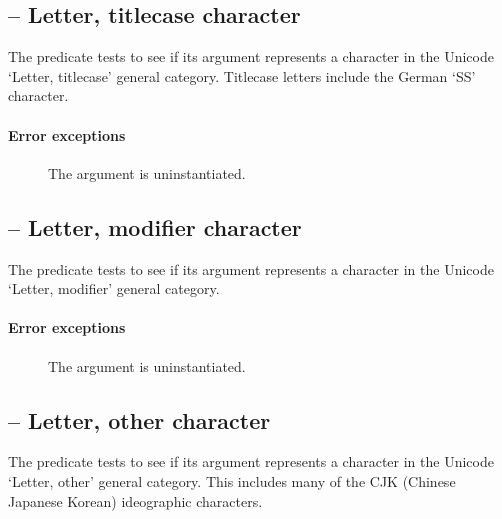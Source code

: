 \subsection{ -- Letter, titlecase character}
\label{chars:isLtChar}

The  predicate tests to see if its  argument represents a character in the Unicode `Letter, titlecase' general category. Titlecase letters include the German `SS' character.
        
\paragraph{Error exceptions}
\begin{description}
\item[]
The argument is uninstantiated.
\end{description}

\subsection{ -- Letter, modifier character}
\label{chars:isLmChar}

The  predicate tests to see if its  argument represents a character in the Unicode `Letter, modifier' general category. 
        
\paragraph{Error exceptions}
\begin{description}
\item[]
The argument is uninstantiated.
\end{description}

\subsection{ -- Letter, other character}
\label{chars:isLoChar}

The  predicate tests to see if its  argument represents a character in the Unicode `Letter, other' general category. This includes many of the CJK (Chinese Japanese Korean) ideographic characters.
        
